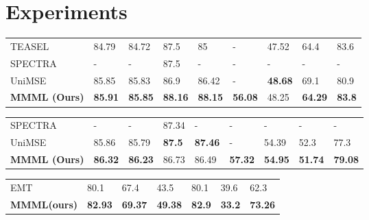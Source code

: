 \documentclass[11pt]{article}
\begin{document}
\section{Experiments}
\begin{table*}
\centering
\begin{subtable}{\textwidth}
\centering
\small
\setlength{\tabcolsep}{3pt}
\renewcommand{\arraystretch}{1.2}
\begin{tabular}{lllllllll}
\hline 
 &  &  &  &  &  &  &  &  \\ \hline
TEASEL & 84.79 & 84.72 & 87.5 & 85 & - & 47.52 & 64.4 & 83.6 \\ 
SPECTRA & - & - & 87.5 & - & - & - & - & - \\ 
UniMSE & 85.85 & 85.83 & 86.9 & 86.42 & - & \textbf{48.68} & 69.1 & 80.9 \\ \hline
\textbf{MMML (Ours)} & \textbf{85.91} & \textbf{85.85} & \textbf{88.16} & \textbf{88.15} & \textbf{56.08} & 48.25 & \textbf{64.29} & \textbf{83.8} \\ \hline
\end{tabular}
\caption{CMU-MOSI}
\label{tab:CMU-MOSI1}
\end{subtable}
\vspace{0.3cm}
\begin{subtable}{\textwidth}
\centering
\small
\setlength{\tabcolsep}{3pt}
\renewcommand{\arraystretch}{1.2}
\begin{tabular}{lllllllll}
\hline
 &  &  &  &  &  &  &  &  \\ \hline
SPECTRA & - & - & 87.34 & - & - & - & - & - \\ 
UniMSE & 85.86 & 85.79 & \textbf{87.5} & \textbf{87.46} & - & 54.39 & 52.3 & 77.3 \\ \hline
\textbf{MMML (Ours)} & \textbf{86.32} & \textbf{86.23} & 86.73 & 86.49 & \textbf{57.32} & \textbf{54.95} & \textbf{51.74} & \textbf{79.08} \\ \hline
\end{tabular}
\caption{CMU-MOSEI}
\label{tab:CMU-MOSEI1}
\end{subtable}
\vspace{0.3cm}
\begin{subtable}{\textwidth}
\centering
\small
\setlength{\tabcolsep}{3pt}
\renewcommand{\arraystretch}{1.2}
\begin{tabular}{lllllll}
\hline
 &  &  &  &  &  &  \\ \hline
EMT & 80.1 & 67.4 & 43.5 & 80.1 & 39.6 & 62.3 \\ \hline
\textbf{MMML(ours)} & \textbf{82.93} & \textbf{69.37} & \textbf{49.38} & \textbf{82.9} & \textbf{33.2} & \textbf{73.26} \\ \hline
\end{tabular}
\caption{CH-SIMS}
\label{tab:CH-SIMS1}
\end{subtable}
\caption{\textbf{Comparison with SOTA}: All three datasets achieve state-of-the-art performance.}
\label{tab:Performance1}
\end{table*}
 
\end{document}
